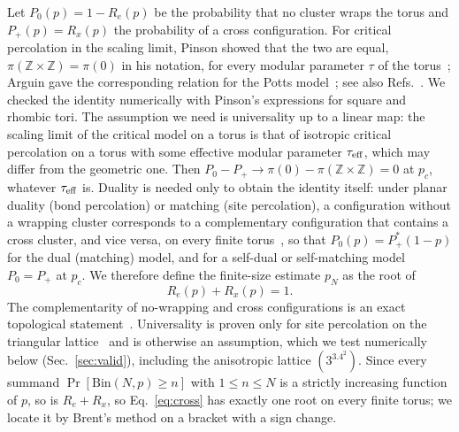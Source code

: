 \documentclass[pre,twocolumn,superscriptaddress,longbibliography,floatfix]{revtex4-2}
\newcommand{\pc}{p_c}
\begin{document}
Let $P_0(p)=1-R_e(p)$ be the probability that no cluster wraps the torus and $P_+(p)=R_x(p)$ the probability of a cross configuration. For critical percolation in the scaling limit, Pinson showed that the two are equal, $\pi(\mathbb Z\times\mathbb Z)=\pi(0)$ in his notation, for every modular parameter $\tau$ of the torus~\cite{Pinson94}; Arguin gave the corresponding relation for the Potts model~\cite{Arguin02}; see also Refs.~\cite{DiFrancesco87,ZiffLorenzKleban99}. We checked the identity numerically with Pinson's expressions for square and rhombic tori. The assumption we need is universality up to a linear map: the scaling limit of the critical model on a torus is that of isotropic critical percolation on a torus with some effective modular parameter $\tau_{\rm eff}$, which may differ from the geometric one. Then $P_0-P_+\to\pi(0)-\pi(\mathbb Z\times\mathbb Z)=0$ at $\pc$, whatever $\tau_{\rm eff}$ is. Duality is needed only to obtain the identity itself: under planar duality (bond percolation) or matching (site percolation), a configuration without a wrapping cluster corresponds to a complementary configuration that contains a cross cluster, and vice versa, on every finite torus~\cite{MertensZiff16}, so that $P_0(p)=P_+^\ast(1-p)$ for the dual (matching) model, and for a self-dual or self-matching model $P_0=P_+$ at $\pc$. We therefore define the finite-size estimate $p_N$ as the root of
\begin{equation}
R_e(p)+R_x(p)=1.
\label{eq:cross}
\end{equation}
The complementarity of no-wrapping and cross configurations is an exact topological statement~\cite{MertensZiff16}. Universality is proven only for site percolation on the triangular lattice~\cite{Smirnov01} and is otherwise an assumption, which we test numerically below (Sec.~\ref{sec:valid}), including the anisotropic lattice $(3^3.4^2)$. Since every summand $\Pr[\mathrm{Bin}(N,p)\ge n]$ with $1\le n\le N$ is a strictly increasing function of $p$, so is $R_e+R_x$, so Eq.~\eqref{eq:cross} has exactly one root on every finite torus; we locate it by Brent's method on a bracket with a sign change.
\end{document}
